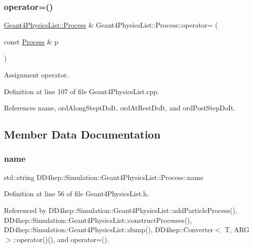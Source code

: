 \subsubsection{\texorpdfstring{operator=()}{operator=()}}
{\footnotesize\ttfamily \hyperlink{class_d_d4hep_1_1_simulation_1_1_geant4_physics_list_1_1_process}{Geant4\+Physics\+List\+::\+Process} \& Geant4\+Physics\+List\+::\+Process\+::operator= (\begin{DoxyParamCaption}\item[{const \hyperlink{class_d_d4hep_1_1_simulation_1_1_geant4_physics_list_1_1_process}{Process} \&}]{p }\end{DoxyParamCaption})}



Assignment operator. 



Definition at line 107 of file Geant4\+Physics\+List.\+cpp.



References name, ord\+Along\+Stept\+Do\+It, ord\+At\+Rest\+Do\+It, and ord\+Post\+Step\+Do\+It.



\subsection{Member Data Documentation}
\hypertarget{class_d_d4hep_1_1_simulation_1_1_geant4_physics_list_1_1_process_a215e1b0b76f9da5783f191129c1abf0d}{}\label{class_d_d4hep_1_1_simulation_1_1_geant4_physics_list_1_1_process_a215e1b0b76f9da5783f191129c1abf0d} 
\subsubsection{\texorpdfstring{name}{name}}
{\footnotesize\ttfamily std\+::string D\+D4hep\+::\+Simulation\+::\+Geant4\+Physics\+List\+::\+Process\+::name}



Definition at line 56 of file Geant4\+Physics\+List.\+h.



Referenced by D\+D4hep\+::\+Simulation\+::\+Geant4\+Physics\+List\+::add\+Particle\+Process(), D\+D4hep\+::\+Simulation\+::\+Geant4\+Physics\+List\+::construct\+Processes(), D\+D4hep\+::\+Simulation\+::\+Geant4\+Physics\+List\+::dump(), D\+D4hep\+::\+Converter$<$ T, A\+R\+G $>$\+::operator()(), and operator=().


